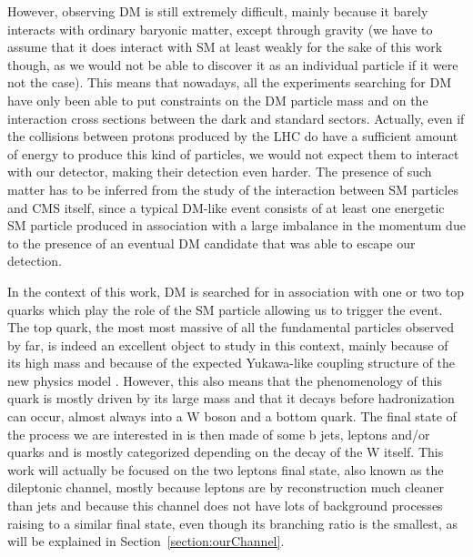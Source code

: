 \documentclass[a4paper, 10pt, openright]{report}
\begin{document}
However, observing \ac{DM} is still extremely difficult, mainly because it barely interacts with ordinary baryonic matter, except through gravity (we have to assume that it does interact with \ac{SM} at least weakly for the sake of this work though, as we would not be able to discover it as an individual particle if it were not the case). This means that nowadays, all the experiments searching for \ac{DM} have only been able to put constraints on the \ac{DM} particle mass and on the interaction cross sections between the dark and standard sectors. Actually, even if the collisions between protons produced by the LHC do have a sufficient amount of energy to produce this kind of particles, we would not expect them to interact with our detector, making their detection even harder. The presence of such matter has to be inferred from the study of the interaction between \ac{SM} particles and \ac{CMS} itself, since a typical \ac{DM}-like event consists of at least one energetic \ac{SM} particle produced in association with a large imbalance in the momentum due to the presence of an eventual \ac{DM} candidate that was able to escape our detection. %

In the context of this work, \ac{DM} is searched for in association with one or two top quarks which play the role of the \ac{SM} particle allowing us to trigger the event. The top quark, the most most massive of all the fundamental particles observed by far, is indeed an excellent object to study in this context, mainly because of its high mass and because of the expected Yukawa-like coupling structure of the new physics model \cite{MFVYukawa}. However, this also means that the phenomenology of this quark is mostly driven by its large mass and that it decays before hadronization can occur, almost always into a W boson and a bottom quark. The final state of the process we are interested in is then made of some b jets, leptons and/or quarks and is mostly categorized depending on the decay of the W itself. This work will actually be focused on the two leptons final state, also known as the dileptonic channel, mostly because leptons are by reconstruction much cleaner than jets and because this channel does not have lots of background processes raising to a similar final state, even though its branching ratio is the smallest, as will be explained in Section~\ref{section:ourChannel}.
\end{document}
